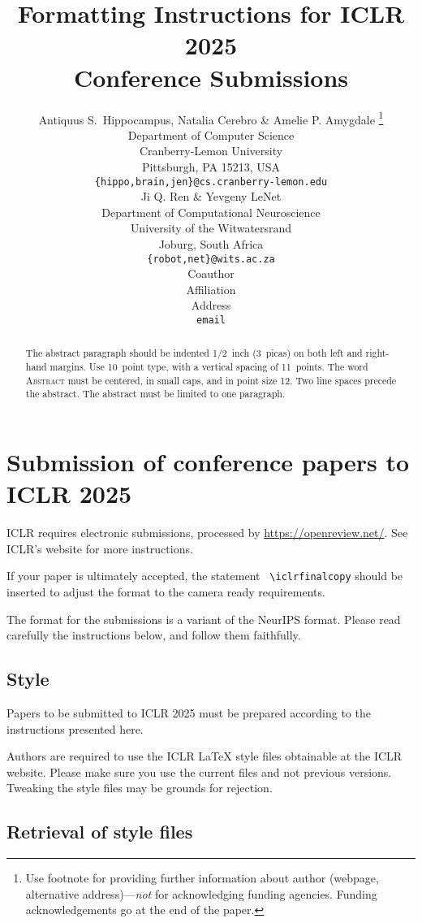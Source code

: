 \documentclass{article} %
\title{Formatting Instructions for ICLR 2025 \\ Conference Submissions}
\author{Antiquus S.~Hippocampus, Natalia Cerebro \& Amelie P. Amygdale \thanks{ Use footnote for providing further information
		about author (webpage, alternative address)---\emph{not} for acknowledging
		funding agencies.  Funding acknowledgements go at the end of the paper.} \\
	Department of Computer Science\\
	Cranberry-Lemon University\\
	Pittsburgh, PA 15213, USA \\
	\texttt{\{hippo,brain,jen\}@cs.cranberry-lemon.edu} \\
	\And
	Ji Q. Ren \& Yevgeny LeNet \\
	Department of Computational Neuroscience \\
	University of the Witwatersrand \\
	Joburg, South Africa \\
	\texttt{\{robot,net\}@wits.ac.za} \\
	\AND
	Coauthor \\
	Affiliation \\
	Address \\
	\texttt{email}
}
\begin{document}
	
	
	\maketitle
	
	\begin{abstract}
		The abstract paragraph should be indented 1/2~inch (3~picas) on both left and
		right-hand margins. Use 10~point type, with a vertical spacing of 11~points.
		The word \textsc{Abstract} must be centered, in small caps, and in point size 12. Two
		line spaces precede the abstract. The abstract must be limited to one
		paragraph.
	\end{abstract}
	
	\section{Submission of conference papers to ICLR 2025}
	
	ICLR requires electronic submissions, processed by
	\url{https://openreview.net/}. See ICLR's website for more instructions.
	
	If your paper is ultimately accepted, the statement {\tt
		{\textbackslash}iclrfinalcopy} should be inserted to adjust the
	format to the camera ready requirements.
	
	The format for the submissions is a variant of the NeurIPS format.
	Please read carefully the instructions below, and follow them
	faithfully.
	
	\subsection{Style}
	
	Papers to be submitted to ICLR 2025 must be prepared according to the
	instructions presented here.
	
	
	Authors are required to use the ICLR \LaTeX{} style files obtainable at the
	ICLR website. Please make sure you use the current files and
	not previous versions. Tweaking the style files may be grounds for rejection.
	
	\subsection{Retrieval of style files}
	
\end{document}

